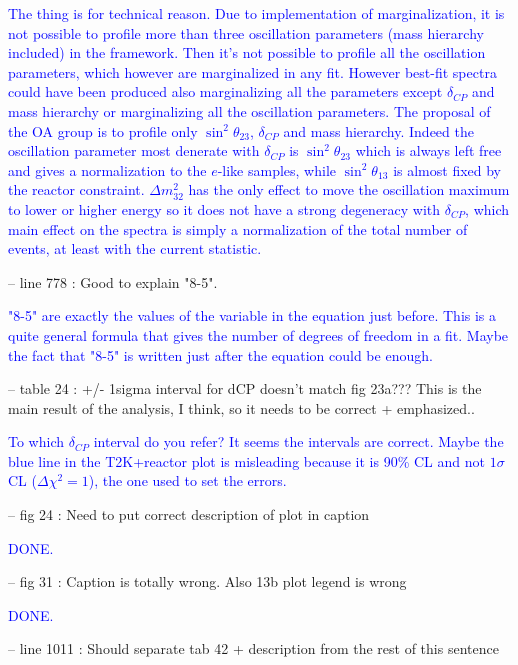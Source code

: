 \documentclass[final]{elsarticle}
\begin{document}
\textcolor{blue}{
The thing is for technical reason. Due to implementation of marginalization, 
it is not possible to profile more than three oscillation parameters (mass hierarchy included) in the framework.
Then it's not possible to profile all the oscillation parameters, which however are marginalized in any fit.
However best-fit spectra could have been produced also marginalizing all the parameters except $\delta_{CP}$ and mass hierarchy
or marginalizing all the oscillation parameters.
The proposal of the OA group is to profile only $\sin^2 \theta_{23}$, $\delta_{CP}$ and mass hierarchy.   
Indeed the  oscillation parameter most denerate with $\delta_{CP}$ is $\sin^2 \theta_{23}$ which is always left free and
gives a normalization to the $e$-like samples, while $\sin^2 \theta_{13}$ is almost fixed by the reactor constraint.
$\Delta m^2_{32}$ has the only effect to move the oscillation maximum to lower or higher energy
so it does not have a strong degeneracy with $\delta_{CP}$, which main effect on the spectra is simply a normalization
of the total number of events, at least with the current statistic.
}

-- line 778 : Good to explain "8-5".

\textcolor{blue}{"8-5" are exactly the values of the variable in the equation just before.
This is a quite general formula that gives the number of degrees of freedom in a fit.
Maybe the fact that "8-5" is written just after the equation could be enough. }

-- table 24 : +/- 1sigma interval for dCP doesn't match fig 23a??? This is
the main result of the analysis, I think, so it needs to be correct +
emphasized..

\textcolor{blue}{
To which $\delta_{CP}$ interval do you refer?
It seems the intervals are correct. Maybe the blue line in the T2K+reactor plot is misleading
because it is 90\% CL and not $1\sigma$ CL ($\Delta \chi^2 = 1$), the one used to set the errors. }

-- fig 24 : Need to put correct description of plot in caption

\textcolor{blue}{DONE.}

-- fig 31 : Caption is totally wrong.  Also 13b plot legend is wrong

\textcolor{blue}{DONE.}

-- line 1011 : Should separate tab 42 + description from the rest of this
sentence
\end{document}
